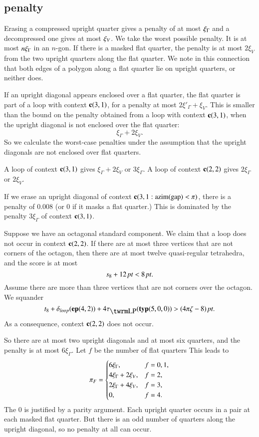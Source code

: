 \subsection{penalty} %
\label{sec:4.2} \label{sec:penalty}

Erasing a compressed upright quarter gives a penalty of
at most $\xi_\Gamma$ and a decompressed one gives at most $\xi_V$. We
take the worst possible penalty.  It is at most $n\xi_\Gamma$ in an
$n$-gon. If there is a masked flat quarter, the penalty is at most
$2\xi_V$ from the two upright quarters along the flat quarter.  We
note in this connection that both edges of a polygon along a flat
quarter lie on upright quarters, or neither does.

If an upright diagonal appears enclosed over a flat quarter, the
flat quarter is part of a loop with context ${\operatorname{\bf c}}{(3,1)}$, for a
penalty at most $2\xi'_\Gamma+\xi_V$.  This is smaller than the
bound on the penalty obtained from a loop with context
${\operatorname{\bf c}}{(3,1)}$, when the upright diagonal is not enclosed over the
flat quarter:
    $$\xi_\Gamma + 2\xi_V.$$
So we calculate the worst-case penalties under the assumption that
the upright diagonals are not enclosed over flat quarters.

A loop of context ${\operatorname{\bf c}}{(3,1)}$ gives $\xi_\Gamma+2\xi_V$ or
$3\xi_\Gamma$.  A loop of context ${\operatorname{\bf c}}{(2,2)}$ gives
$2\xi_\Gamma$ or $2\xi_V$.

If we erase an  upright diagonal of context ${\operatorname{\bf c}}{(3,1: {\operatorname{azim}}({\operatorname{gap}}) <\pi)}$, there is a penalty
of $0.008$ (or 0 if it masks a flat quarter.) This is dominated by
the penalty $3\xi_\Gamma$ of context ${\operatorname{\bf c}}{(3,1)}$.

Suppose we have an octagonal standard component.  We claim that a loop
does not occur in context ${\operatorname{\bf c}}{(2,2)}$. If there are at most three
vertices that are not corners of the octagon, then there are at most
twelve quasi-regular tetrahedra, and the score is at most
$$s_8 + 12\,\hbox{\it pt}<8\,\hbox{\it pt}.$$
Assume there are more than three vertices that are not corners
over the octagon. We squander
$$t_8+ \dloop(\y{(4,2)})+4\tlp(\pqr{(5,0,0)}) > \squander.$$
As a consequence, context ${\operatorname{\bf c}}{(2,2)}$ does not occur.

So there are at most two upright diagonals and at most six quarters,
and the penalty is at most $6\xi_\Gamma$. Let $f$ be the number of
flat quarters This leads to
    $$
    {\pi_F} = \begin{cases} 6\xi_\Gamma, & f=0,1,\\
                   4\xi_\Gamma+2\xi_V, & f=2,\\
                    2\xi_\Gamma+4\xi_V, & f=3,\\
                    0, & f=4.
            \end{cases}
    $$
The 0 is justified by a parity argument.  Each upright quarter
occurs in a pair at each masked flat quarter.  But there is an odd
number of quarters along the upright diagonal, so no penalty at
all can occur.

